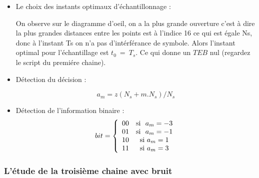\documentclass[11pt]{article}
\begin{document}
\begin{itemize}
    \item Le choix des instants optimaux d’échantillonnage : \par
    On observe sur le diagramme d'oeil, on a la plus grande ouverture c'est à dire la plus grandes distances entre les points est à l'indice 16  ce qui est égale Ns, donc à l'instant Ts on n'a pas d'intérférance de symbole. Alors l'instant optimal pour l'échantillage est $t_0 \ = \ T_s$. Ce qui donne un $TEB$ nul (regardez le script du premiére chaine).

    \item Détection du décision :  \par


 $$   a_{m} = z(N_{s} +m.N_{s})/N_{s} $$
    


    \item Détection de l'information binaire : 
    \[
bit =  
\left \{
   \begin{array}{r c l}
      00 & \text{si } \ a_{m} =  -3\\
      01 & \text{si } \ a_{m} = -1 \\
      10 & \text{si}  \ a_{m} = 1 \\
      11 & \text{si}  \ a_{m} = 3
      
     
   \end{array}
\right .
\]

    
\end{itemize}

\subsubsection{L'étude de la troisième chaine avec bruit}
\end{document}

